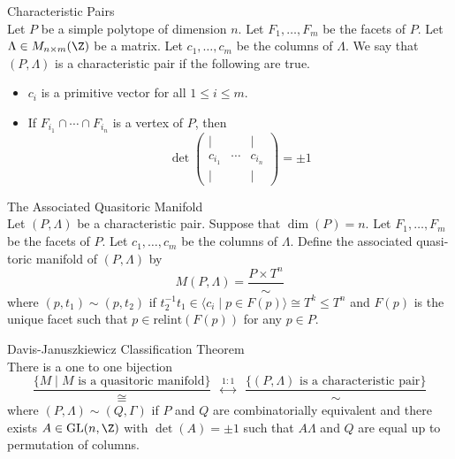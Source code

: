 \documentclass[a4paper]{article}
\begin{document}
\begin{defn}{Characteristic Pairs}{}\\
Let $P$ be a simple polytope of dimension $n$. Let $F_1,\dots,F_m$ be the facets of $P$. Let $\Lambda\in M_{n\times m}(\Z)$ be a matrix. Let $c_1,\dots,c_m$ be the columns of $\Lambda$. We say that $(P,\Lambda)$ is a characteristic pair if the following are true. 
\begin{itemize}
\item $c_i$ is a primitive vector for all $1\leq i\leq m$. 
\item If $F_{i_1}\cap\cdots\cap F_{i_n}$ is a vertex of $P$, then $$\det\begin{pmatrix}
| & & |\\
c_{i_1} & \cdots & c_{i_n}\\
| & & |
\end{pmatrix}=\pm1$$
\end{itemize}
\end{defn}

\begin{defn}{The Associated Quasitoric Manifold}{}\\
Let $(P,\Lambda)$ be a characteristic pair. Suppose that $\dim(P)=n$. Let $F_1,\dots,F_m$ be the facets of $P$. Let $c_1,\dots,c_m$ be the columns of $\Lambda$. Define the associated quasi-toric manifold of $(P,\Lambda)$ by $$M(P,\Lambda)=\frac{P\times T^n}{\sim}$$ where $(p,t_1)\sim(p,t_2)$ if $t_2^{-1}t_1\in\langle c_i\;|\;p\in F(p)\rangle\cong T^k\leq T^n$ and $F(p)$ is the unique facet such that $p\in\text{relint}(F(p))$ for any $p\in P$. 
\end{defn}

\begin{thm}{Davis-Januszkiewicz Classification Theorem}{}\\
There is a one to one bijection $$\frac{\{M\;|\;M\text{ is a quasitoric manifold}\}}{\cong}\;\;\overset{1:1}{\leftrightarrow}\;\;\frac{\{(P,\Lambda)\text{ is a characteristic pair}\}}{\sim}$$ where $(P,\Lambda)\sim(Q,\Gamma)$ if $P$ and $Q$ are combinatorially equivalent and there exists $A\in\text{GL}(n,\Z)$ with $\det(A)=\pm1$ such that $A\Lambda$ and $Q$ are equal up to permutation of columns. 
\end{thm}
\end{document}
